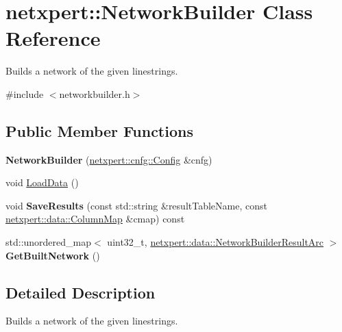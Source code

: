 \hypertarget{classnetxpert_1_1NetworkBuilder}{}\section{netxpert\+:\+:Network\+Builder Class Reference}
\label{classnetxpert_1_1NetworkBuilder}


Builds a network of the given linestrings.  




{\ttfamily \#include $<$networkbuilder.\+h$>$}

\subsection*{Public Member Functions}
\begin{DoxyCompactItemize}
\item 
{\bfseries Network\+Builder} (\hyperlink{structnetxpert_1_1cnfg_1_1Config}{netxpert\+::cnfg\+::\+Config} \&cnfg)\hypertarget{classnetxpert_1_1NetworkBuilder_a13d5e72464e3f89262ebcd895afffbfe}{}\label{classnetxpert_1_1NetworkBuilder_a13d5e72464e3f89262ebcd895afffbfe}

\item 
void \hyperlink{classnetxpert_1_1NetworkBuilder_a70a8c45f04b0ad7acedd93881ac4a72f}{Load\+Data} ()
\item 
void {\bfseries Save\+Results} (const std\+::string \&result\+Table\+Name, const \hyperlink{structnetxpert_1_1data_1_1ColumnMap}{netxpert\+::data\+::\+Column\+Map} \&cmap) const \hypertarget{classnetxpert_1_1NetworkBuilder_a6f13e74431743fd769b820e6c369a210}{}\label{classnetxpert_1_1NetworkBuilder_a6f13e74431743fd769b820e6c369a210}

\item 
std\+::unordered\+\_\+map$<$ uint32\+\_\+t, \hyperlink{structnetxpert_1_1data_1_1NetworkBuilderResultArc}{netxpert\+::data\+::\+Network\+Builder\+Result\+Arc} $>$ {\bfseries Get\+Built\+Network} ()\hypertarget{classnetxpert_1_1NetworkBuilder_aeb4830f91f3bdf24925b4524bd7adc3f}{}\label{classnetxpert_1_1NetworkBuilder_aeb4830f91f3bdf24925b4524bd7adc3f}

\end{DoxyCompactItemize}


\subsection{Detailed Description}
Builds a network of the given linestrings. 


